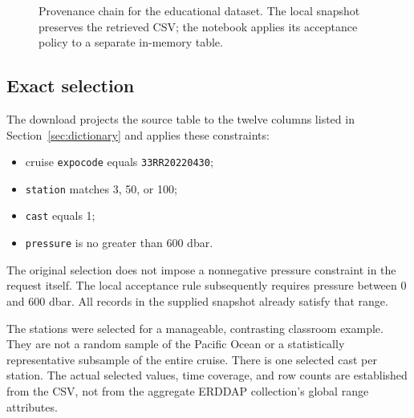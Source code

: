 \documentclass[11pt,letterpaper]{article}
\newcommand{\field}[1]{\nolinkurl{#1}}
\begin{document}
\begin{figure}[htbp]
\centering
{}
\caption{Provenance chain for the educational dataset. The local snapshot preserves the retrieved CSV; the notebook applies its acceptance policy to a separate in-memory table.}
\label{fig:lineage}
\end{figure}

\subsection{Exact selection}
The download projects the source table to the twelve columns listed in Section~\ref{sec:dictionary} and applies these constraints:
\begin{itemize}
  \item cruise \field{expocode} equals \field{33RR20220430};
  \item \field{station} matches 3, 50, or 100;
  \item \field{cast} equals 1;
  \item \field{pressure} is no greater than 600 dbar.
\end{itemize}
The original selection does not impose a nonnegative pressure constraint in the request itself. The local acceptance rule subsequently requires pressure between 0 and 600 dbar. All records in the supplied snapshot already satisfy that range.

The stations were selected for a manageable, contrasting classroom example. They are not a random sample of the Pacific Ocean or a statistically representative subsample of the entire cruise. There is one selected cast per station. The actual selected values, time coverage, and row counts are established from the CSV, not from the aggregate ERDDAP collection's global range attributes.
\end{document}
